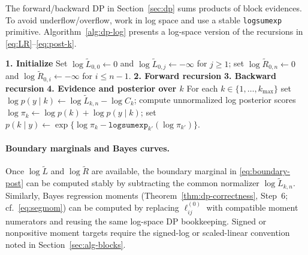 The forward/backward DP in Section~\ref{sec:dp} sums products of block evidences.
To avoid underflow/overflow, work in log space and use a stable
\texttt{logsumexp} primitive.
Algorithm~\ref{alg:dp-log} presents a log-space version of the recursions in
\eqref{eq:LR}--\eqref{eq:post-k}.

\begin{algorithm}[H]
\caption{DPLog$(\ell^{(0)}_{ij},k_{\max},\log p(k),\log C_k)$}
\label{alg:dp-log}
\KwIn{Log block evidences $\ell^{(0)}_{ij}=\log \widetilde{A}^{(0)}_{ij}$ on the index set $\{0\le i<j\le n\}$ (block $(i,j]$);
maximum segments $k_{\max}$;
log prior on $k$, $\log p(k)$;
log normalizers $\log C_k$ computed under the same admissible-block and length-prior convention as the score array. For the index-uniform fixed-$k$ prior with $g\equiv1$, $C_k=\binom{n-1}{k-1}$ unless the caller has intentionally absorbed a normalized prior into the block or count scores.}
\BlankLine
\textbf{1. Initialize}\;
Set $\log \widetilde{L}_{0,0}\leftarrow 0$ and $\log \widetilde{L}_{0,j}\leftarrow -\infty$ for $j\ge 1$;
set $\log \widetilde{R}_{0,n}\leftarrow 0$ and $\log \widetilde{R}_{0,i}\leftarrow -\infty$ for $i\le n-1$.
\BlankLine
\textbf{2. Forward recursion}\;
\BlankLine
\textbf{3. Backward recursion}\;
\BlankLine
\textbf{4. Evidence and posterior over $k$}\;
For each $k\in\{1,\dots,k_{\max}\}$ set
$\log p(y\mid k)\leftarrow \log \widetilde{L}_{k,n} - \log C_k$;
compute unnormalized log posterior scores
$\log \pi_k \leftarrow \log p(k) + \log p(y\mid k)$;
set $p(k\mid y)\leftarrow \exp\{\log \pi_k - \texttt{logsumexp}_{k'}(\log \pi_{k'})\}$.
\end{algorithm}

\paragraph{Boundary marginals and Bayes curves.}
Once $\log\widetilde{L}$ and $\log\widetilde{R}$ are available, the boundary marginal in
\eqref{eq:boundary-post} can be computed stably by subtracting the common normalizer
$\log\widetilde{L}_{k,n}$.
Similarly, Bayes regression moments (Theorem~\ref{thm:dp-correctness}, Step~6; cf.\ \eqref{eq:segmom})
can be computed by replacing $\ell^{(0)}_{ij}$ with compatible moment numerators and reusing the
same log-space DP bookkeeping. Signed or nonpositive moment targets require the signed-log or
scaled-linear convention noted in Section~\ref{sec:alg-blocks}.

